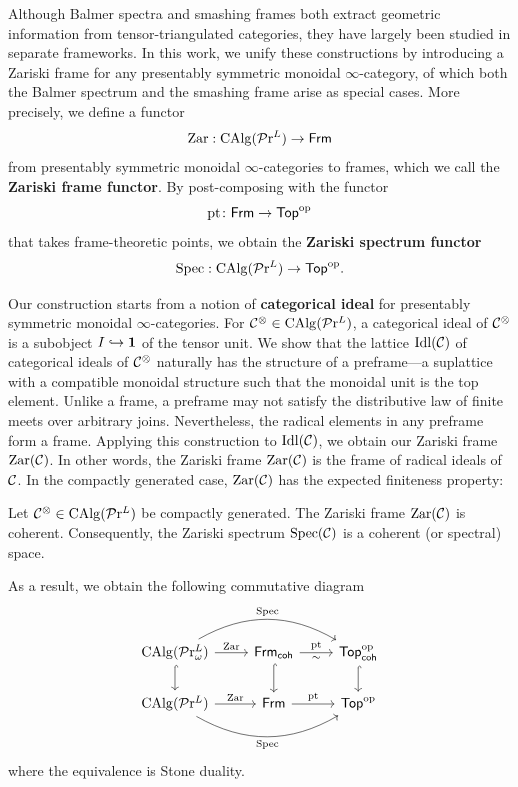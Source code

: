 \documentclass[10pt,a4paper,oneside]{article}
\begin{document}
Although Balmer spectra and smashing frames both extract geometric information from tensor-triangulated categories, they have largely been studied in separate frameworks. In this work, we unify these constructions by introducing a Zariski frame for any presentably symmetric monoidal $\infty$-category, of which both the Balmer spectrum and the smashing frame arise as special cases. More precisely, we define a functor
\[
\operatorname{Zar}: \operatorname{CAlg}(\mathcal{P}\mathrm{r}^L) \to \mathsf{Frm}
\]
from presentably symmetric monoidal $\infty$-categories to frames, which we call the \textbf{Zariski frame functor}. By post-composing with the functor
\[
\operatorname{pt} \colon \mathsf{Frm} \to \mathsf{Top}^{\operatorname{op}}
\]
that takes frame-theoretic points, we obtain the \textbf{Zariski spectrum functor}
\[
\operatorname{Spec}: \operatorname{CAlg}(\mathcal{P}\mathrm{r}^L) \to \mathsf{Top}^{\operatorname{op}}.
\]

Our construction starts from a notion of \textbf{categorical ideal} for presentably symmetric monoidal $\infty$-categories. For $\mathcal{C}^\otimes \in \operatorname{CAlg}(\mathcal{P}\mathrm{r}^L)$, a categorical ideal of $\mathcal{C}^\otimes$ is a subobject $I\hookrightarrow\mathbf1$ of the tensor unit. We show that the lattice $\operatorname{Idl}(\mathcal{C})$ of categorical ideals of $\mathcal{C}^\otimes$ naturally has the structure of a preframe---a suplattice with a compatible monoidal structure such that the monoidal unit is the top element. Unlike a frame, a preframe may not satisfy the distributive law of finite meets over arbitrary joins. Nevertheless, the radical elements in any preframe form a frame. Applying this construction to $\operatorname{Idl}(\mathcal{C})$, we obtain our Zariski frame $\operatorname{Zar}(\mathcal{C})$. In other words, the Zariski frame $\operatorname{Zar}(\mathcal{C})$ is the frame of radical ideals of $\mathcal{C}$. In the compactly generated case, $\operatorname{Zar}(\mathcal{C})$ has the expected finiteness property:
\begin{thm}\label{thm:a}
Let $\mathcal{C}^\otimes\in\operatorname{CAlg}(\mathcal{P}\mathrm{r}^L)$ be compactly generated. The Zariski frame $\operatorname{Zar}(\mathcal{C})$ is coherent. Consequently, the Zariski spectrum $\operatorname{Spec}(\mathcal{C})$ is a coherent (or spectral) space.
\end{thm}

As a result, we obtain the following commutative diagram
\[
\begin{tikzcd}
\calg(\prl_\omega) \arrow[d, hook] \arrow[r, "\op{Zar}"] \arrow[rr, "\spec", bend left] & \frmcoh \arrow[d, hook] \arrow[r, "\op{pt}", "\sim"'] & \topcoh \arrow[d, hook] \\
\calg(\prl) \arrow[r, "\op{Zar}"] \arrow[rr, "\spec"', bend right]                      & \frm \arrow[r, "\op{pt}"]                  & \Top           
\end{tikzcd}
\]
where the equivalence is Stone duality.
\end{document}

